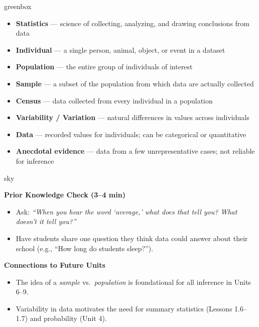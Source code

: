 \documentclass[10pt]{article}
\begin{document}
\begin{skillbox}{greenbox}
\begin{minipage}[t]{0.48\linewidth}
    \begin{itemize}
        \item \textbf{Statistics} --- science of collecting, analyzing, and drawing conclusions from data
        \item \textbf{Individual} --- a single person, animal, object, or event in a dataset
        \item \textbf{Population} --- the entire group of individuals of interest
        \item \textbf{Sample} --- a subset of the population from which data are actually collected
    \end{itemize}
\end{minipage}
\hfill
\begin{minipage}[t]{0.48\linewidth}
    \begin{itemize}
        \item \textbf{Census} --- data collected from every individual in a population
        \item \textbf{Variability / Variation} --- natural differences in values across individuals
        \item \textbf{Data} --- recorded values for individuals; can be categorical or quantitative
        \item \textbf{Anecdotal evidence} --- data from a few unrepresentative cases; not reliable for inference
    \end{itemize}
\end{minipage}
\end{skillbox}

\begin{skillbox}{sky}
\begin{minipage}[t]{0.48\linewidth}
    \textbf{Prior Knowledge Check (3--4 min)}
    \begin{itemize}
        \item Ask: \textit{``When you hear the word `average,' what does that tell you? What doesn't it tell you?''}
        \item Have students share one question they think data could answer about their school (e.g., ``How long do students sleep?'').
    \end{itemize}
\end{minipage}
\hfill
\begin{minipage}[t]{0.48\linewidth}
    \textbf{Connections to Future Units}
    \begin{itemize}
        \item The idea of a \textit{sample} vs.\ \textit{population} is foundational for all inference in Units 6--9.
        \item Variability in data motivates the need for summary statistics (Lessons 1.6--1.7) and probability (Unit 4).
    \end{itemize}
\end{minipage}
\end{skillbox}
\end{document}
